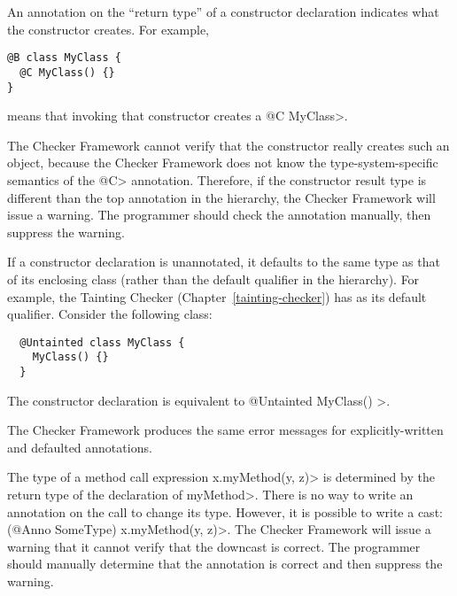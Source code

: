 \newpage
{}


An annotation on the ``return type'' of a constructor declaration indicates
what the constructor creates.  For example,

\begin{Verbatim}
@B class MyClass {
  @C MyClass() {}
}
\end{Verbatim}

\noindent
means that invoking that constructor creates a \<@C MyClass>.

The Checker Framework cannot verify that the constructor really creates
such an object, because the Checker Framework does not know the
type-system-specific semantics of the \<@C> annotation.
Therefore, if the constructor result type is different than the top annotation in the
hierarchy, the Checker Framework will issue a warning.
The programmer should check the annotation manually, then
suppress the warning.



If a constructor declaration is unannotated, it defaults to the same type as that of
its enclosing class (rather than the default qualifier in the hierarchy).
For example, the Tainting Checker (Chapter~\ref{tainting-checker}) has 
as its default qualifier. Consider the following class:

\begin{Verbatim}
  @Untainted class MyClass {
    MyClass() {}
  }
\end{Verbatim}

\noindent
The constructor declaration is equivalent to \<@Untainted MyClass() \ttlcb\ttrcb>.

The Checker Framework produces the same error messages for
explicitly-written and defaulted annotations.



The type of a method call expression \<x.myMethod(y, z)> is determined by
the return type of the declaration of \<myMethod>.  There is no way to
write an annotation on the call to change its type.  However, it is
possible to write a cast:  \<(@Anno SomeType) x.myMethod(y, z)>.  The Checker
Framework will issue a warning that it cannot verify that the downcast is
correct.  The programmer should manually determine that the annotation is
correct and then suppress the warning.

